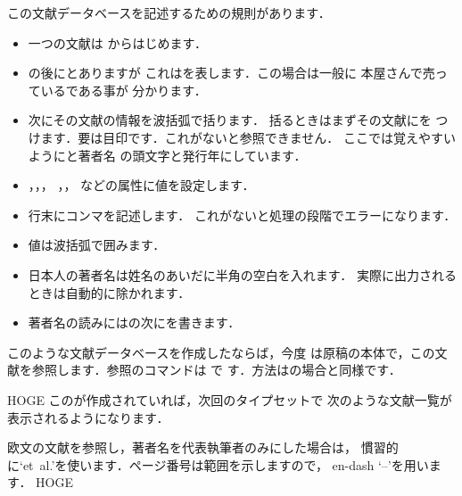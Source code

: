 この文献データベースを記述するための規則があります．
\begin{itemize}
 \item 一つの文献は からはじめます．

 \item \qu{\str@}の後にとありますが
       これはを表します．この場合は一般に
       本屋さんで売っているである事が
       分かります．

%
 \item 次にその文献の情報を{波括弧}で括ります．
       括るときはまずその文献にを
       つけます．要は目印です．これがないと参照できません．
       ここでは覚えやすいようにと著者名
       の頭文字と発行年にしています．

 \item {}，，，
       ，，
       などの属性に値を設定します．

 \item {行末にコンマを記述します}．
       これがないと処理の段階でエラーになります．

 \item {値は波括弧で囲みます}．

 \item 日本人の著者名は姓名のあいだに半角の空白を入れます．
       {実際に出力されるときは自動的に除かれます}．

 \item 著者名の読みにはの次にを書きます．
\end{itemize}
このような文献データベースを作成したならば，今度
は原稿の本体で，この文献を参照します．参照のコマンドは  で
す．方法はの場合と同様です．


HOGE
このが作成されていれば，次回のタイプセットで
次のような文献一覧が表示されるようになります．
欧文の文献を参照し，著者名を代表執筆者のみにした場合は，
慣習的に`et~al.'を使います．ページ番号は範囲を示しますので，
en-dash `--'を用います．
HOGE

